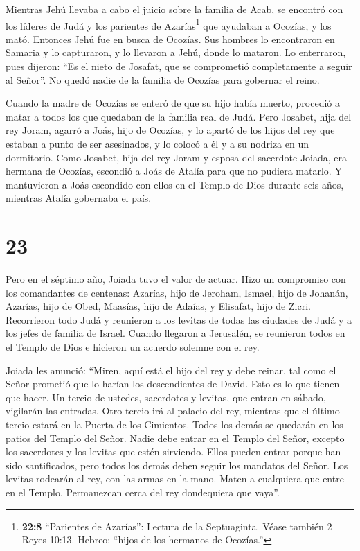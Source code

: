  Mientras Jehú llevaba a cabo el juicio sobre la familia de
Acab, se encontró con los líderes de Judá y los parientes de
Azarías\footnote{\textbf{22:8} ``Parientes de Azarías'': Lectura de la
  Septuaginta. Véase también 2 Reyes 10:13. Hebreo: ``hijos de los
  hermanos de Ocozías.''} que ayudaban a Ocozías, y los mató.
 Entonces Jehú fue en busca de Ocozías. Sus hombres lo
encontraron en Samaria y lo capturaron, y lo llevaron a Jehú, donde lo
mataron. Lo enterraron, pues dijeron: ``Es el nieto de Josafat, que se
comprometió completamente a seguir al Señor''. No quedó nadie de la
familia de Ocozías para gobernar el reino.

 Cuando la madre de Ocozías se enteró de que su hijo había
muerto, procedió a matar a todos los que quedaban de la familia real de
Judá.  Pero Josabet, hija del rey Joram, agarró a Joás,
hijo de Ocozías, y lo apartó de los hijos del rey que estaban a punto de
ser asesinados, y lo colocó a él y a su nodriza en un dormitorio. Como
Josabet, hija del rey Joram y esposa del sacerdote Joiada, era hermana
de Ocozías, escondió a Joás de Atalía para que no pudiera matarlo.
 Y mantuvieron a Joás escondido con ellos en el Templo de
Dios durante seis años, mientras Atalía gobernaba el país.

\hypertarget{section-22}{%
\section{23}\label{section-22}}

 Pero en el séptimo año, Joiada tuvo el valor de actuar.
Hizo un compromiso con los comandantes de centenas: Azarías, hijo de
Jeroham, Ismael, hijo de Johanán, Azarías, hijo de Obed, Maasías, hijo
de Adaías, y Elisafat, hijo de Zicri.  Recorrieron todo Judá
y reunieron a los levitas de todas las ciudades de Judá y a los jefes de
familia de Israel. Cuando llegaron a Jerusalén,  se
reunieron todos en el Templo de Dios e hicieron un acuerdo solemne con
el rey.

Joiada les anunció: ``Miren, aquí está el hijo del rey y debe reinar,
tal como el Señor prometió que lo harían los descendientes de David.
 Esto es lo que tienen que hacer. Un tercio de ustedes,
sacerdotes y levitas, que entran en sábado, vigilarán las entradas.
 Otro tercio irá al palacio del rey, mientras que el último
tercio estará en la Puerta de los Cimientos. Todos los demás se quedarán
en los patios del Templo del Señor.  Nadie debe entrar en el
Templo del Señor, excepto los sacerdotes y los levitas que estén
sirviendo. Ellos pueden entrar porque han sido santificados, pero todos
los demás deben seguir los mandatos del Señor.  Los levitas
rodearán al rey, con las armas en la mano. Maten a cualquiera que entre
en el Templo. Permanezcan cerca del rey dondequiera que vaya''.

